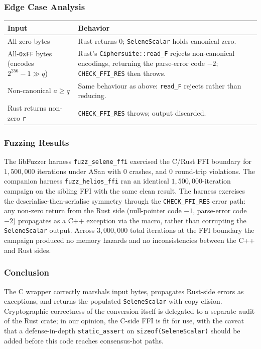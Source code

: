 \documentclass[12pt,titlepage,table]{article}
\begin{document}
\subsubsection{Edge Case Analysis}
\begin{table}[htbp]
\centering
{
\begin{tabular}{| p{1.8in} | p{4.3in} |}
\hline
\textbf{Input} & \textbf{Behavior} \\
\hline
\hline
All-zero bytes & Rust returns $0$; \verb+SeleneScalar+ holds canonical zero. \\
All-\verb+0xFF+ bytes (encodes $2^{256}-1 \gg q$) & Rust's \verb+Ciphersuite::read_F+ rejects non-canonical encodings, returning the parse-error code $-2$; \verb+CHECK_FFI_RES+ then throws. \\
Non-canonical $a \geq q$ & Same behaviour as above: \verb+read_F+ rejects rather than reducing. \\
Rust returns non-zero \verb+r+ & \verb+CHECK_FFI_RES+ throws; output discarded. \\
\hline
\end{tabular}}
\end{table}

\subsubsection{Fuzzing Results}
The libFuzzer harness \verb+fuzz_selene_ffi+ exercised the C/Rust FFI boundary for $1{,}500{,}000$ iterations under ASan with $0$ crashes, and $0$ round-trip violations.  The companion harness \verb+fuzz_helios_ffi+ ran an identical $1{,}500{,}000$-iteration campaign on the sibling FFI with the same clean result.  The harness exercises the deserialise-then-serialise symmetry through the \verb+CHECK_FFI_RES+ error path: any non-zero return from the Rust side (null-pointer code $-1$, parse-error code $-2$) propagates as a C++ exception via the macro, rather than corrupting the \verb+SeleneScalar+ output.  Across $3{,}000{,}000$ total iterations at the FFI boundary the campaign produced no memory hazards and no inconsistencies between the C++ and Rust sides.

\subsubsection[Conclusion]{Conclusion \hfill \checkmark}
The C wrapper correctly marshals input bytes, propagates Rust-side errors as exceptions, and returns the populated \verb+SeleneScalar+ with copy elision.  Cryptographic correctness of the conversion itself is delegated to a separate audit of the Rust crate; in our opinion, the C-side FFI is fit for use, with the caveat that a defense-in-depth \verb+static_assert+ on \verb!sizeof(SeleneScalar)! should be added before this code reaches consensus-hot paths.
\end{document}
